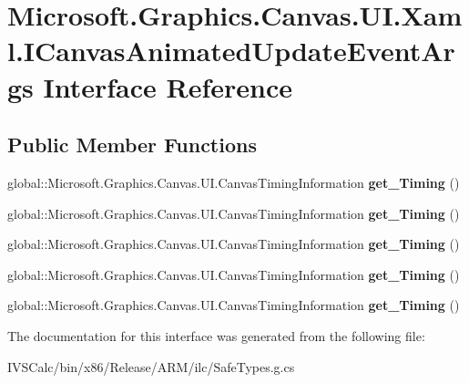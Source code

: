 \hypertarget{interface_microsoft_1_1_graphics_1_1_canvas_1_1_u_i_1_1_xaml_1_1_i_canvas_animated_update_event_args}{}\section{Microsoft.\+Graphics.\+Canvas.\+U\+I.\+Xaml.\+I\+Canvas\+Animated\+Update\+Event\+Args Interface Reference}
\label{interface_microsoft_1_1_graphics_1_1_canvas_1_1_u_i_1_1_xaml_1_1_i_canvas_animated_update_event_args}
\subsection*{Public Member Functions}
\begin{DoxyCompactItemize}
\item 
\mbox{\label{interface_microsoft_1_1_graphics_1_1_canvas_1_1_u_i_1_1_xaml_1_1_i_canvas_animated_update_event_args_a7e91a59c566ec759ae58f952eeb2e778}} 
global\+::\+Microsoft.\+Graphics.\+Canvas.\+U\+I.\+Canvas\+Timing\+Information {\bfseries get\+\_\+\+Timing} ()
\item 
\mbox{\label{interface_microsoft_1_1_graphics_1_1_canvas_1_1_u_i_1_1_xaml_1_1_i_canvas_animated_update_event_args_a7e91a59c566ec759ae58f952eeb2e778}} 
global\+::\+Microsoft.\+Graphics.\+Canvas.\+U\+I.\+Canvas\+Timing\+Information {\bfseries get\+\_\+\+Timing} ()
\item 
\mbox{\label{interface_microsoft_1_1_graphics_1_1_canvas_1_1_u_i_1_1_xaml_1_1_i_canvas_animated_update_event_args_a7e91a59c566ec759ae58f952eeb2e778}} 
global\+::\+Microsoft.\+Graphics.\+Canvas.\+U\+I.\+Canvas\+Timing\+Information {\bfseries get\+\_\+\+Timing} ()
\item 
\mbox{\label{interface_microsoft_1_1_graphics_1_1_canvas_1_1_u_i_1_1_xaml_1_1_i_canvas_animated_update_event_args_a7e91a59c566ec759ae58f952eeb2e778}} 
global\+::\+Microsoft.\+Graphics.\+Canvas.\+U\+I.\+Canvas\+Timing\+Information {\bfseries get\+\_\+\+Timing} ()
\item 
\mbox{\label{interface_microsoft_1_1_graphics_1_1_canvas_1_1_u_i_1_1_xaml_1_1_i_canvas_animated_update_event_args_a7e91a59c566ec759ae58f952eeb2e778}} 
global\+::\+Microsoft.\+Graphics.\+Canvas.\+U\+I.\+Canvas\+Timing\+Information {\bfseries get\+\_\+\+Timing} ()
\end{DoxyCompactItemize}


The documentation for this interface was generated from the following file\+:\begin{DoxyCompactItemize}
\item 
I\+V\+S\+Calc/bin/x86/\+Release/\+A\+R\+M/ilc/Safe\+Types.\+g.\+cs\end{DoxyCompactItemize}
